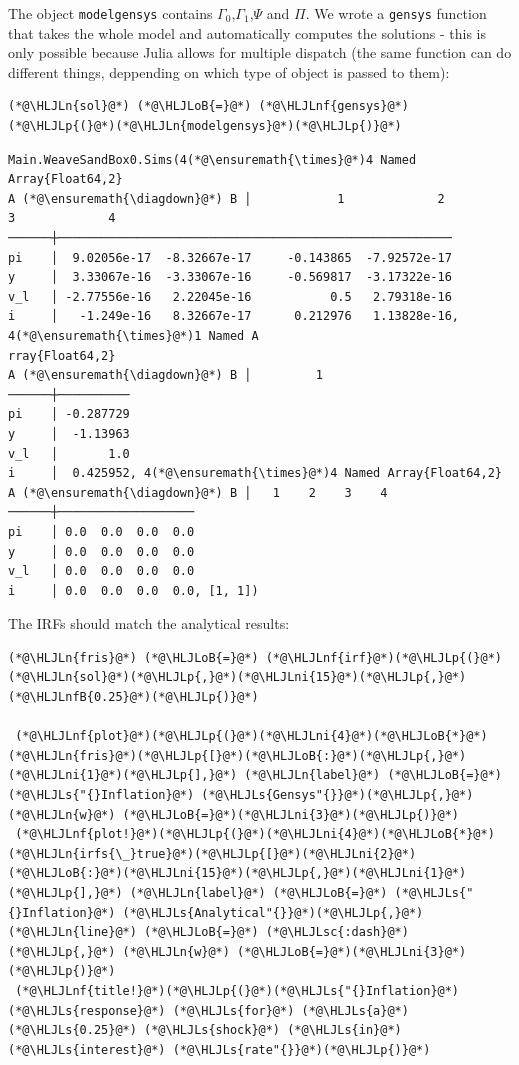 \documentclass[12pt,a4paper]{article}
\newcommand{\HLJLn}[1]{#1}
\newcommand{\HLJLnf}[1]{\textcolor[RGB]{66,102,213}{#1}}
\newcommand{\HLJLs}[1]{\textcolor[RGB]{201,61,57}{#1}}
\newcommand{\HLJLsc}[1]{\textcolor[RGB]{201,61,57}{#1}}
\newcommand{\HLJLnfB}[1]{\textcolor[RGB]{59,151,46}{#1}}
\newcommand{\HLJLni}[1]{\textcolor[RGB]{59,151,46}{#1}}
\newcommand{\HLJLoB}[1]{\textcolor[RGB]{102,102,102}{\textbf{#1}}}
\newcommand{\HLJLp}[1]{#1}
\begin{document}
The object \texttt{modelgensys} contains $\Gamma_0$,$\Gamma_1$,$\Psi$ and $\Pi$. We wrote a \texttt{gensys} function that takes the whole model and automatically computes the solutions - this is only possible because Julia allows for multiple dispatch (the same function can do different things, deppending on which type of object is passed to them):


\begin{lstlisting}
(*@\HLJLn{sol}@*) (*@\HLJLoB{=}@*) (*@\HLJLnf{gensys}@*)(*@\HLJLp{(}@*)(*@\HLJLn{modelgensys}@*)(*@\HLJLp{)}@*)
\end{lstlisting}

\begin{lstlisting}
Main.WeaveSandBox0.Sims(4(*@\ensuremath{\times}@*)4 Named Array{Float64,2}
A (*@\ensuremath{\diagdown}@*) B │            1             2             3             4
──────┼───────────────────────────────────────────────────────
pi    │  9.02056e-17  -8.32667e-17     -0.143865  -7.92572e-17
y     │  3.33067e-16  -3.33067e-16     -0.569817  -3.17322e-16
v_l   │ -2.77556e-16   2.22045e-16           0.5   2.79318e-16
i     │   -1.249e-16   8.32667e-17      0.212976   1.13828e-16, 4(*@\ensuremath{\times}@*)1 Named A
rray{Float64,2}
A (*@\ensuremath{\diagdown}@*) B │         1
──────┼──────────
pi    │ -0.287729
y     │  -1.13963
v_l   │       1.0
i     │  0.425952, 4(*@\ensuremath{\times}@*)4 Named Array{Float64,2}
A (*@\ensuremath{\diagdown}@*) B │   1    2    3    4
──────┼───────────────────
pi    │ 0.0  0.0  0.0  0.0
y     │ 0.0  0.0  0.0  0.0
v_l   │ 0.0  0.0  0.0  0.0
i     │ 0.0  0.0  0.0  0.0, [1, 1])
\end{lstlisting}


The IRFs should match the analytical results:


\begin{lstlisting}
(*@\HLJLn{fris}@*) (*@\HLJLoB{=}@*) (*@\HLJLnf{irf}@*)(*@\HLJLp{(}@*)(*@\HLJLn{sol}@*)(*@\HLJLp{,}@*)(*@\HLJLni{15}@*)(*@\HLJLp{,}@*)(*@\HLJLnfB{0.25}@*)(*@\HLJLp{)}@*)

 (*@\HLJLnf{plot}@*)(*@\HLJLp{(}@*)(*@\HLJLni{4}@*)(*@\HLJLoB{*}@*)(*@\HLJLn{fris}@*)(*@\HLJLp{[}@*)(*@\HLJLoB{:}@*)(*@\HLJLp{,}@*)(*@\HLJLni{1}@*)(*@\HLJLp{],}@*) (*@\HLJLn{label}@*) (*@\HLJLoB{=}@*) (*@\HLJLs{"{}Inflation}@*) (*@\HLJLs{Gensys"{}}@*)(*@\HLJLp{,}@*) (*@\HLJLn{w}@*) (*@\HLJLoB{=}@*)(*@\HLJLni{3}@*)(*@\HLJLp{)}@*)
 (*@\HLJLnf{plot!}@*)(*@\HLJLp{(}@*)(*@\HLJLni{4}@*)(*@\HLJLoB{*}@*)(*@\HLJLn{irfs{\_}true}@*)(*@\HLJLp{[}@*)(*@\HLJLni{2}@*)(*@\HLJLoB{:}@*)(*@\HLJLni{15}@*)(*@\HLJLp{,}@*)(*@\HLJLni{1}@*)(*@\HLJLp{],}@*) (*@\HLJLn{label}@*) (*@\HLJLoB{=}@*) (*@\HLJLs{"{}Inflation}@*) (*@\HLJLs{Analytical"{}}@*)(*@\HLJLp{,}@*) (*@\HLJLn{line}@*) (*@\HLJLoB{=}@*) (*@\HLJLsc{:dash}@*)(*@\HLJLp{,}@*) (*@\HLJLn{w}@*) (*@\HLJLoB{=}@*)(*@\HLJLni{3}@*)(*@\HLJLp{)}@*)
 (*@\HLJLnf{title!}@*)(*@\HLJLp{(}@*)(*@\HLJLs{"{}Inflation}@*) (*@\HLJLs{response}@*) (*@\HLJLs{for}@*) (*@\HLJLs{a}@*) (*@\HLJLs{0.25}@*) (*@\HLJLs{shock}@*) (*@\HLJLs{in}@*) (*@\HLJLs{interest}@*) (*@\HLJLs{rate"{}}@*)(*@\HLJLp{)}@*)
\end{lstlisting}
\end{document}
